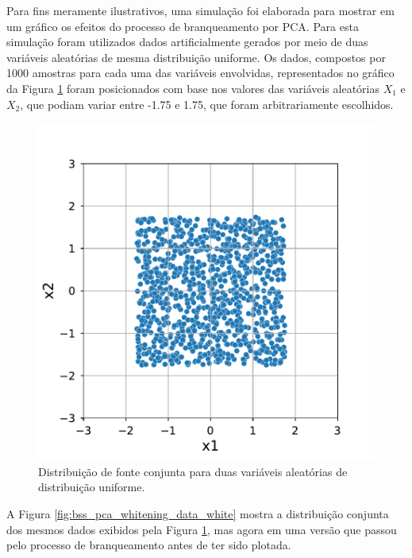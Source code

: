 
Para fins meramente ilustrativos, uma simulação foi elaborada para mostrar em um gráfico os efeitos do processo de branqueamento por PCA. Para esta simulação foram utilizados dados artificialmente gerados por meio de duas variáveis aleatórias de mesma distribuição uniforme. Os dados, compostos por 1000 amostras para cada uma das variáveis envolvidas, representados no gráfico da Figura \ref{fig:bss_pca_whitening_data} foram posicionados com base nos valores das variáveis aleatórias $X_{1}$ e $X_{2}$, que podiam variar entre -1.75 e 1.75, que foram arbitrariamente escolhidos.

\begin{figure}[H]
    \centering
    \includegraphics[width=0.70\linewidth]{figs/whitening/data.pdf}
    \caption{Distribuição de fonte conjunta para duas variáveis aleatórias de distribuição uniforme.}
    \label{fig:bss_pca_whitening_data}
\end{figure}

A Figura \ref{fig:bss_pca_whitening_data_white} mostra a distribuição conjunta dos mesmos dados exibidos pela Figura \ref{fig:bss_pca_whitening_data}, mas agora em uma versão que passou pelo processo de branqueamento antes de ter sido plotada.

